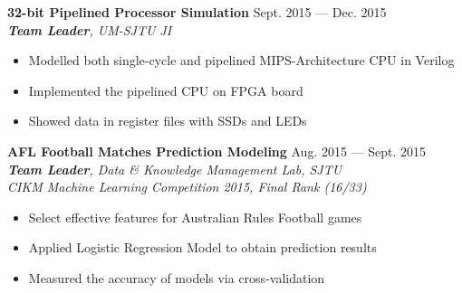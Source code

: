 \documentclass[margin,line,10pt]{res}
\begin{document}
\begin{resume}

{
\small
{\bf 32-bit Pipelined Processor Simulation} \hfill Sept. 2015 --- Dec. 2015\\
{\it \textbf{Team Leader}, UM-SJTU JI}
}
\begin{itemize}
\setlength{\itemsep}{0pt}
\setlength{\parskip}{0pt}
\setlength{\parsep}{0pt}
\item {\small Modelled both single-cycle and pipelined MIPS-Architecture CPU in Verilog}
\item {\small Implemented the pipelined CPU on FPGA board}
\item {\small Showed data in register files with SSDs and LEDs}
\end{itemize}
{
\small
{\bf AFL Football Matches Prediction Modeling} \hfill Aug. 2015 --- Sept. 2015\\
{\it \textbf{Team Leader}, Data \& Knowledge Management Lab, SJTU \\ CIKM Machine Learning Competition 2015, Final Rank (16/33)}
}
\begin{itemize}
\setlength{\itemsep}{0pt}
\setlength{\parskip}{0pt}
\setlength{\parsep}{0pt}
\item {\small Select effective features for Australian Rules Football games}
\item {\small Applied Logistic Regression Model to obtain prediction results}
\item {\small Measured the accuracy of models via cross-validation}\\
\end{itemize}


\end{resume}
\end{document}
